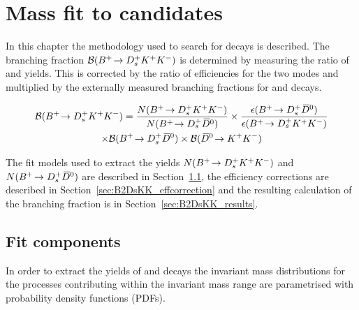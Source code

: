 \chapter{Mass fit to \decay{\Bp}{\Dsp\Kp\Km} candidates} 
\label{ch:B2DsKK}

\minitoc

In this chapter the methodology used to search for \decay{\Bp}{\Dsp\Kp\Km} decays is described.
The branching fraction ${\mathcal{B}}({{{B}^+}}\!\rightarrow {\ensuremath{{D}^+_{s}}}{\ensuremath{{K}^+}}{\ensuremath{{K}^-}})$ is determined by measuring the ratio of \decay{\Bp}{\Dsp\Kp\Km} and \decay{\Bp}{\Dsp\Dzb} yields. 
This is corrected by the ratio of efficiencies for the two modes and multiplied by the externally measured branching fractions for \decay{\Bp}{\Dsp\Dzb} and \decay{\Dzb}{\Kp\Km} decays.



\begin{multline}
\BF(\decay{\Bp}{\Dsp\Kp\Km}) = \frac{N(\decay{\Bp}{\Dsp\Kp\Km})}{N(\decay{\Bp}{\Dsp\Dzb})} \times  \frac{\epsilon(\decay{\Bp}{\Dsp\Dzb})}{\epsilon(\decay{\Bp}{\Dsp\Kp\Km})}\\ 
\times \BF(\decay{\Bp}{\Dsp\Dzb}) \times \BF(\decay{\Dzb}{\Kp\Km}) 
\end{multline}

The fit models used to extract the yields $N({{{B}^+}}\!\rightarrow {\ensuremath{{D}^+_{s}}}{\ensuremath{{K}^+}}{\ensuremath{{K}^-}})$ and $N({{{B}^+}}\!\rightarrow {\ensuremath{{D}^+_{s}}}{\ensuremath{{\kern 0.2em\overline{\kern -0.2em D}{}}{}^0}})$ are described in Section~\ref{sec:B2DsKK_fitcomps}, the efficiency corrections are described in Section~\ref{sec:B2DsKK_effcorrection} and the resulting calculation of the branching fraction is in Section~\ref{sec:B2DsKK_results}.


\section{Fit components}
\label{sec:B2DsKK_fitcomps}

In order to extract the yields of \decay{\Bp}{\Dsp\Dzb} and \decay{\Bp}{\Dsp\Kp\Km} decays the invariant mass distributions for the processes contributing within the invariant mass range are parametrised with probability density functions (PDFs).

